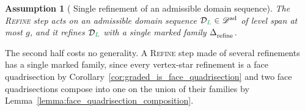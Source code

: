 \documentclass[a4paper, 12pt]{article}
\makeatletter
\newcommand{\robert}[1]{{\color{orange} #1}}
\newcommand{\green}{\color{ForestGreen}}
\DeclareRobustCommand{\simplexsubsetTwo}[2][]{\Delta\ifx\@empty#1\@empty\else^{#1}\fi_{#2}}
\renewcommand{\L}{{\green L}}
\newcommand{\allpartitions}{\mathscr{C}^{\mathrm{sp}}}
\newtheorem{assumption}[theorem]{Assumption}
\theoremstyle{definition}
\theoremstyle{plain}
\numberwithin{equation}{section}
\DeclareRobustCommand{\domseq}[1][]{\mathcal{D}\ifx\@empty#1\@empty\else_{#1}\fi}
\renewcommand{\allpartitions}{\mathscr{D}^{\mathrm{ad}}}
\makeatother
\begin{document}
\begin{assumption}[\robert{Single refinement of an admissible domain sequence}]
    \label{ass:single_refinement}
    \robert{The \textsc{Refine} step acts on an admissible domain sequence $\domseq[\L] \in \allpartitions$ of level span at most $g$, and it refines $\domseq[\L]$ with a single marked family $\simplexsubsetTwo{\mathrm{refine}}$.}
\end{assumption}

\robert{The second half costs no generality. A \textsc{Refine} step made of several refinements has a single marked family, since every vertex-star refinement is a face quadrisection by Corollary~\ref{cor:graded_is_face_quadrisection} and two face quadrisections compose into one on the union of their families by Lemma~\ref{lemma:face_quadrisection_composition}.}
\end{document}
